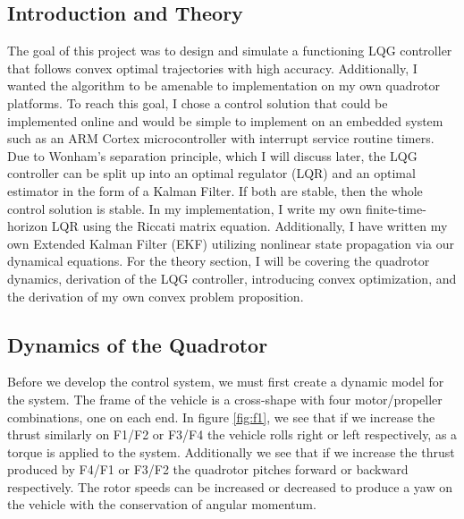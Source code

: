 \documentclass[conf]{new-aiaa}
\begin{document}
\clearpage
\begin{doublespace}

\section{Introduction and Theory}
The goal of this project was to design and simulate a functioning LQG controller that follows convex optimal trajectories with high accuracy. Additionally, I wanted the algorithm to be amenable to implementation on my own quadrotor platforms. To reach this goal, I chose a control solution that could be implemented online and would be simple to implement on an embedded system such as an ARM Cortex microcontroller with interrupt service routine timers. Due to Wonham's separation principle, which I will discuss later, the LQG controller can be split up into an optimal regulator (LQR) and an optimal estimator in the form of a Kalman Filter. If both are stable, then the whole control solution is stable. In my implementation, I write my own finite-time-horizon LQR using the Riccati matrix equation. Additionally, I have written my own Extended Kalman Filter (EKF) utilizing nonlinear state propagation via our dynamical equations. For the theory section, I will be covering the quadrotor dynamics, derivation of the LQG controller, introducing convex optimization, and the derivation of my own convex problem proposition.
\subsection{Dynamics of the Quadrotor}
Before we develop the control system, we must first create a dynamic model for the system. The frame of the vehicle is a cross-shape with four motor/propeller combinations, one on each end. In figure \ref{fig:f1}, we see that if we increase the thrust similarly on F1/F2 or F3/F4 the vehicle rolls right or left respectively, as a torque is applied to the system. Additionally we see that if we increase the thrust produced by F4/F1 or F3/F2 the quadrotor pitches forward or backward respectively. The rotor speeds can be increased or decreased to produce a yaw on the vehicle with the conservation of angular momentum. 


\end{doublespace}
\end{document}
